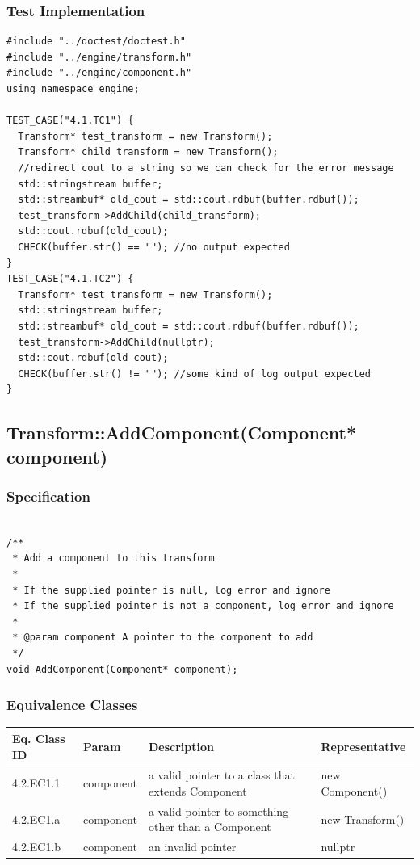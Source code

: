 \documentclass[11pt]{article}
\begin{document}
\subsubsection*{Test Implementation}
\label{sec:org3e01e99}
\begin{verbatim}
#include "../doctest/doctest.h"
#include "../engine/transform.h"
#include "../engine/component.h"
using namespace engine;

TEST_CASE("4.1.TC1") {
  Transform* test_transform = new Transform();
  Transform* child_transform = new Transform();
  //redirect cout to a string so we can check for the error message
  std::stringstream buffer;
  std::streambuf* old_cout = std::cout.rdbuf(buffer.rdbuf());
  test_transform->AddChild(child_transform);
  std::cout.rdbuf(old_cout);
  CHECK(buffer.str() == ""); //no output expected
}
TEST_CASE("4.1.TC2") {
  Transform* test_transform = new Transform();
  std::stringstream buffer;
  std::streambuf* old_cout = std::cout.rdbuf(buffer.rdbuf());
  test_transform->AddChild(nullptr);
  std::cout.rdbuf(old_cout);
  CHECK(buffer.str() != ""); //some kind of log output expected    
}
\end{verbatim}

\clearpage
\subsection{Transform::AddComponent(Component* component)}
\label{sec:orgaa4f9f0}
\subsubsection*{Specification}
\label{sec:org8a21000}
\begin{verbatim}

/**
 * Add a component to this transform
 *
 * If the supplied pointer is null, log error and ignore
 * If the supplied pointer is not a component, log error and ignore
 *
 * @param component A pointer to the component to add
 */  
void AddComponent(Component* component);
\end{verbatim}
\subsubsection*{Equivalence Classes}
\label{sec:org7ea67c1}
\begin{center}
\begin{tabularx}{\textwidth}{lXXX}
\hline
\textbf{Eq. Class ID} & \textbf{Param} & \textbf{Description} & \textbf{Representative}\\
\hline
4.2.EC1.1 & component & a valid pointer to a class that extends Component & new Component()\\
\hline
4.2.EC1.a & component & a valid pointer to something other than a Component & new Transform()\\
\hline
4.2.EC1.b & component & an invalid pointer & nullptr\\
\hline
\end{tabularx}
\end{center}
\end{document}
